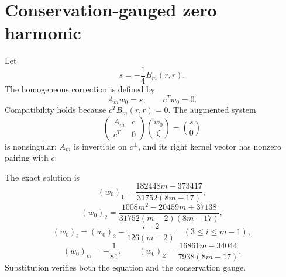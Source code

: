 \section*{Conservation-gauged zero harmonic}
Let
\[
s=-\frac14B_m(r,r).
\]
The homogeneous correction is defined by
\[
A_mw_0=s,
\qquad c^Tw_0=0.
\]
Compatibility holds because $c^TB_m(r,r)=0$.  The augmented system
\[
\begin{pmatrix}A_m&c\\c^T&0\end{pmatrix}
\binom{w_0}{\zeta}=\binom{s}{0}
\]
is nonsingular: $A_m$ is invertible on $c^\perp$, and its right kernel vector
has nonzero pairing with $c$.

The exact solution is
\[
(w_0)_1=\frac{182448m-373417}{31752(8m-17)},
\]
\[
(w_0)_2=\frac{1008m^2-20459m+37138}
{31752(m-2)(8m-17)},
\]
\[
(w_0)_i=(w_0)_2-\frac{i-2}{126(m-2)}
\quad(3\le i\le m-1),
\]
\[
(w_0)_m=-\frac1{81},
\qquad
(w_0)_Z=\frac{16861m-34044}{7938(8m-17)}.
\]
Substitution verifies both the equation and the conservation gauge.
